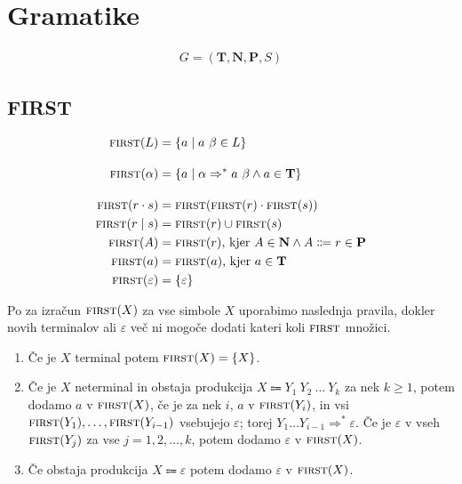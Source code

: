 \documentclass{report}
\newcommand{\Null}{\varepsilon}
\newcommand{\Seq}{\cdot}
\newcommand{\Spc}{\ }
\newcommand{\Union}{\mathrel{|}}
\newcommand{\Set}[1]{\mathbf{#1}}
\newcommand{\FIRST}{\textsc{first}}
\newcommand{\Terminals}{\Set{T}}
\newcommand{\Productions}{\Set{P}}
\newcommand{\NonTerminals}{\Set{N}}
\newcommand{\Arrow}{\Coloneq}
\newcommand{\DeriveStar}{\Rightarrow^\ast}
\newcommand{\NT}[1]{{#1}}
\newcommand{\T}[1]{{#1}}
\newcommand{\Sym}[1]{{#1}}
\begin{document}
\chapter{Gramatike}

\begin{tcolorbox}[title={Definicija}]
  \begin{equation*}
    \begin{aligned}
      G = (\Terminals, \NonTerminals, \Productions, \NT{S})
    \end{aligned}
  \end{equation*}
\end{tcolorbox}

\section{FIRST}
\begin{tcolorbox}[title={Definicija}]
  \begin{equation*}
    \begin{aligned}
      \FIRST(L) &= \{ \T{a} \mid \T{a} \Spc \beta \in L \}\\[1em]
      \FIRST(\alpha) &= \{\T{a} \mid \alpha \DeriveStar \T{a} \Spc \beta \land \T{a} \in \Terminals\}\\[1em]
      \FIRST(r \Seq s) &= \FIRST(\FIRST(r) \Seq \FIRST(s))\\
      \FIRST(r \Union s) &= \FIRST(r) \cup \FIRST(s)\\
      \FIRST(\NT{A}) &= \FIRST(r)\text{, kjer } \T{A} \in \NonTerminals \land \NT{A} \Arrow r \in \Productions\\
      \FIRST(\T{a}) &= \FIRST(\T{a})\text{, kjer } \T{a} \in \Terminals\\
      \FIRST(\Null) &= \{\Null\}\\
    \end{aligned}
  \end{equation*}
\end{tcolorbox}

Po \cite{dragonbook} za izračun $\FIRST(\Sym{X})$ za vse simbole $\Sym{X}$ uporabimo naslednja pravila, dokler novih terminalov ali $\Null$ več ni mogoče dodati kateri koli $\FIRST$ množici.

\begin{enumerate}
  \item Če je $\Sym{X}$ terminal potem $\FIRST(\Sym{X}) = \{\Sym{X}\}$.
  \item Če je $\Sym{X}$ neterminal in obstaja produkcija $\Sym{X} \Arrow \Sym{Y}_1 \Spc \Sym{Y}_2 \Spc \dots \Spc \Sym{Y}_k$ za nek $k \geq 1$, potem dodamo $\T{a}$ v $\FIRST(\Sym{X})$, če je za nek $i$, $\T{a}$ v $\FIRST(\Sym{Y}_i)$, in vsi $\FIRST(\Sym{Y}_1), \dots, \FIRST(\Sym{Y}_{i - 1})$ vsebujejo $\Null$; torej $\Sym{Y}_1 \dots \Sym{Y}_{i - 1} \DeriveStar \Null$.
    Če je $\Null$ v vseh $\FIRST(\Sym{Y}_j)$ za vse $j = 1, 2, \dots, k$, potem dodamo $\Null$ v $\FIRST(\Sym{X})$.
  \item Če obstaja produkcija $\Sym{X} \Arrow \Null$ potem dodamo $\Null$ v $\FIRST(\Sym{X})$.
\end{enumerate}
\end{document}
